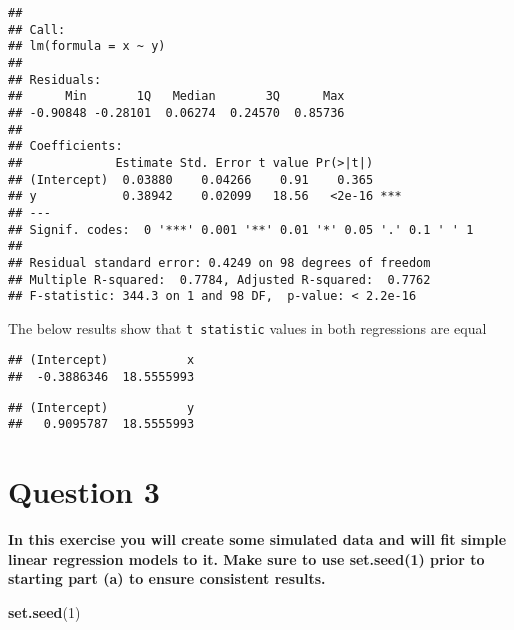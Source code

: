 \documentclass[
]{article}
\newenvironment{Shaded}{\begin{snugshade}}{\end{snugshade}}
\newcommand{\DecValTok}[1]{\textcolor[rgb]{0.00,0.00,0.81}{#1}}
\newcommand{\FunctionTok}[1]{\textcolor[rgb]{0.13,0.29,0.53}{\textbf{#1}}}
\newcommand{\NormalTok}[1]{#1}
\newcommand{\SpecialCharTok}[1]{\textcolor[rgb]{0.81,0.36,0.00}{\textbf{#1}}}
\newcommand{\StringTok}[1]{\textcolor[rgb]{0.31,0.60,0.02}{#1}}
\begin{document}
\begin{verbatim}
## 
## Call:
## lm(formula = x ~ y)
## 
## Residuals:
##      Min       1Q   Median       3Q      Max 
## -0.90848 -0.28101  0.06274  0.24570  0.85736 
## 
## Coefficients:
##             Estimate Std. Error t value Pr(>|t|)    
## (Intercept)  0.03880    0.04266    0.91    0.365    
## y            0.38942    0.02099   18.56   <2e-16 ***
## ---
## Signif. codes:  0 '***' 0.001 '**' 0.01 '*' 0.05 '.' 0.1 ' ' 1
## 
## Residual standard error: 0.4249 on 98 degrees of freedom
## Multiple R-squared:  0.7784, Adjusted R-squared:  0.7762 
## F-statistic: 344.3 on 1 and 98 DF,  p-value: < 2.2e-16
\end{verbatim}

The below results show that \texttt{t\ statistic} values in both
regressions are equal

\begin{Shaded}
\end{Shaded}

\begin{verbatim}
## (Intercept)           x 
##  -0.3886346  18.5555993
\end{verbatim}

\begin{Shaded}
\end{Shaded}

\begin{verbatim}
## (Intercept)           y 
##   0.9095787  18.5555993
\end{verbatim}

\hypertarget{question-3}{%
\section{Question 3}\label{question-3}}

\textbf{In this exercise you will create some simulated data and will
fit simple linear regression models to it. Make sure to use set.seed(1)
prior to starting part (a) to ensure consistent results.}

\begin{Shaded}
\begin{Highlighting}[]
\FunctionTok{set.seed}\NormalTok{(}\DecValTok{1}\NormalTok{)}
\end{Highlighting}
\end{Shaded}
\end{document}
